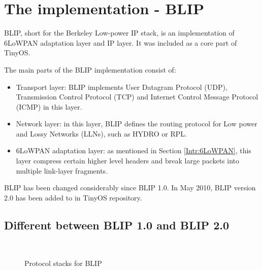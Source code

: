 \section{The implementation - BLIP}
\label{Blip}
BLIP, short for the Berkeley Low-power IP stack, is an implementation of 6LoWPAN adaptation layer and IP layer. It was included as a core part of TinyOS. 

The main parts of the BLIP implementation consist of:
\begin{itemize}
\item Transport layer: BLIP implements User Datagram Protocol (UDP), Transmission Control Protocol (TCP) and Internet Control Message Protocol (ICMP) in this layer.
\newline

\item Network layer: in this layer, BLIP defines the routing protocol for Low power and Lossy Networks (LLNs), such as HYDRO or RPL.
\newline
 
\item 6LoWPAN adaptation layer: as mentioned in Section \ref{Intr:6LoWPAN}, this layer compress certain higher level headers and break large packets into multiple link-layer fragments.
\end{itemize}

BLIP has been changed considerably since BLIP 1.0. In May 2010, BLIP version 2.0 has been added to in TinyOS repository. 
\subsection{Different between BLIP 1.0 and BLIP 2.0}
\label{Blip:1.0-2.0}

\begin{figure}[htbp]
  \begin{center}
    \leavevmode
    \\
    \caption{Protocol stacks for BLIP}
    \label{fig:blip}
  \end{center}
\end{figure}

